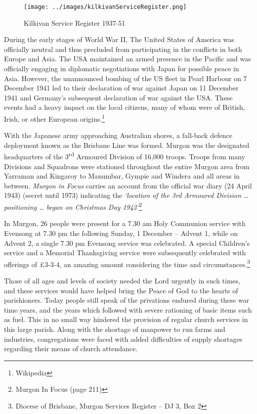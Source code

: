 \begin{figure}
\begin{center}
\texttt{[image: ../images/kilkivanServiceRegister.png]}
\caption{Kilkivan Service Register 1937-51}
\end{center}
\end{figure}




During the early stages of World War II, The United States of America was officially neutral and thus precluded from participating in the conflicts in both Europe and Asia. The USA maintained an armed presence in the Pacific and was officially engaging in diplomatic negotiations with Japan for possible peace in Asia. However, the unannounced bombing of the US fleet in Pearl Harbour on 7 December 1941 led to their declaration of war against Japan on 11 December 1941 and Germany's subsequent declaration of war against the USA. These events had a heavy impact on the local citizens, many of whom were of British, Irish, or other European origins.\footnote{Wikipedia}


With the Japanese army approaching Australian shores, a fall-back defence deployment known as the Brisbane Line was formed. Murgon was the designated headquarters of the 3\textsuperscript{rd} Armoured Division of 16,000 troops. Troops from many Divisions and Squadrons were stationed throughout the entire Murgon area from Yarraman and Kingaroy to Manumbar, Gympie and Windera and all areas in between. \emph{Murgon in Focus} carries an account from the official war diary (24 April 1943) (secret until 1973) indicating the \emph{`location of the 3rd Armoured Division \ldots{} positioning \ldots{} began on Christmas Day 1942'}\footnote{Murgon In Focus (page 211)}


In Murgon, 26 people were present for a 7.30 am Holy Communion service with Evensong at 7.30 pm the following Sunday, 1 December -- Advent 1, while on Advent 2, a single 7.30 pm Evensong service was celebrated. A special Children's service and a Memorial Thanksgiving service were subsequently celebrated with offerings of \pounds3-3-4, an amazing amount considering the time and circumstances.\footnote{Diocese of Brisbane, Murgon Services Register -- DJ 3, Box 2}


Those of all ages and levels of society needed the Lord urgently in such times, and these services would have helped bring the Peace of God to the hearts of parishioners. Today people still speak of the privations endured during these war time years, and the years which followed with severe rationing of basic items such as fuel. This in no small way hindered the provision of regular church services in this large parish. Along with the shortage of manpower to run farms and industries, congregations were faced with added difficulties of supply shortages regarding their means of church attendance.



